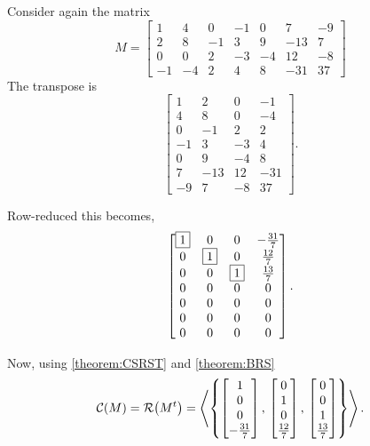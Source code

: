 \documentclass{ximera}
\begin{document}
\begin{example}
  Consider again the matrix
  \[
    M = \begin{bmatrix}
      1 & 4 & 0 & -1 & 0 & 7 &  -9 \\
      2 & 8 &  -1 & 3 & 9 &  -13 & 7\\
      0 & 0 &  2 & -3 & -4 & 12 &  -8\\
      -1 &  -4 & 2 & 4 & 8 &  -31 & 37
    \end{bmatrix}
  \]
  The transpose is
  \[
    \begin{bmatrix}
      1 & 2 & 0 & -1\\
      4 & 8 & 0 & -4\\
      0 & -1 & 2 & 2\\
      -1 & 3 & -3 & 4\\
      0 & 9 & -4 & 8\\
      7 & -13 & 12 & -31\\
      -9 & 7 & -8 & 37
    \end{bmatrix}.
  \]

  Row-reduced this becomes,
  \[
    \begin{bmatrix}
      \fbox{1} & 0 & 0 & -\frac{31}{7}\\
      0 & \fbox{1} & 0 & \frac{12}{7}\\
      0 & 0 & \fbox{1} & \frac{13}{7}\\
      0 & 0 & 0 & 0\\
      0 & 0 & 0 & 0\\
      0 & 0 & 0 & 0\\
      0 & 0 & 0 & 0
    \end{bmatrix}.
  \]

  Now, using \ref{theorem:CSRST} and \ref{theorem:BRS}
  \[
    \mathcal{C}\!\left(M\right)=\mathcal{R}\!\left(M^{t}\right)=
    \left\langle\left\{
        \begin{bmatrix}1\\0\\0\\-\frac{31}{7}\end{bmatrix},\,
        \begin{bmatrix}0\\1\\0\\\frac{12}{7}\end{bmatrix},\,
        \begin{bmatrix}0\\0\\1\\\frac{13}{7}\end{bmatrix}
      \right\}\right\rangle.
  \]


\end{example}
\end{document}
